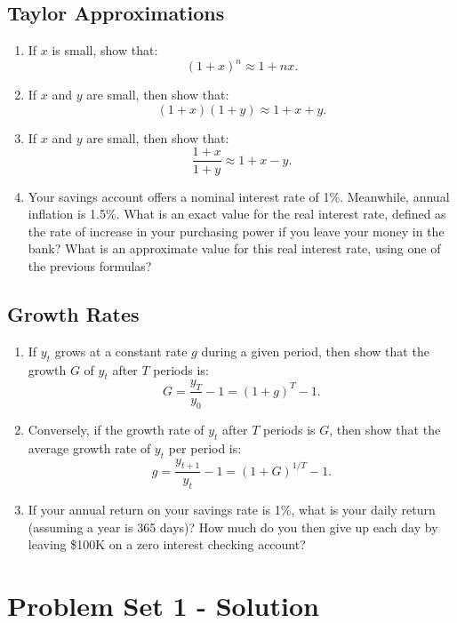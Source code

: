 \documentclass[]{book}
\theoremstyle{definition}
\theoremstyle{definition}
\theoremstyle{definition}
\theoremstyle{remark}
\begin{document}
\section{Taylor Approximations}\label{taylor-approximations}

\begin{enumerate}
\def\labelenumi{\arabic{enumi}.}
\item
  If \(x\) is small, show that: \[(1+x)^n \approx 1+nx.\]
\item
  If \(x\) and \(y\) are small, then show that:
  \[(1+x)(1+y) \approx 1+x+y.\]
\item
  If \(x\) and \(y\) are small, then show that:
  \[\frac{1+x}{1+y} \approx 1+x-y.\]
\item
  Your savings account offers a nominal interest rate of 1\%. Meanwhile,
  annual inflation is 1.5\%. What is an exact value for the real
  interest rate, defined as the rate of increase in your purchasing
  power if you leave your money in the bank? What is an approximate
  value for this real interest rate, using one of the previous formulas?
\end{enumerate}

\section{Growth Rates}\label{growth-rates}

\begin{enumerate}
\def\labelenumi{\arabic{enumi}.}
\item
  If \(y_t\) grows at a constant rate \(g\) during a given period, then
  show that the growth \(G\) of \(y_t\) after \(T\) periods is:
  \[G = \frac{y_T}{y_0}-1=(1+g)^T-1.\]
\item
  Conversely, if the growth rate of \(y_t\) after \(T\) periods is
  \(G\), then show that the average growth rate of \(y_t\) per period
  is: \[g = \frac{y_{t+1}}{y_{t}}-1=(1+G)^{1/T}-1.\]
\item
  If your annual return on your savings rate is 1\%, what is your daily
  return (assuming a year is 365 days)? How much do you then give up
  each day by leaving \$100K on a zero interest checking account?
\end{enumerate}

\chapter*{Problem Set 1 - Solution}\label{problem-set-1---solution}
\end{document}
